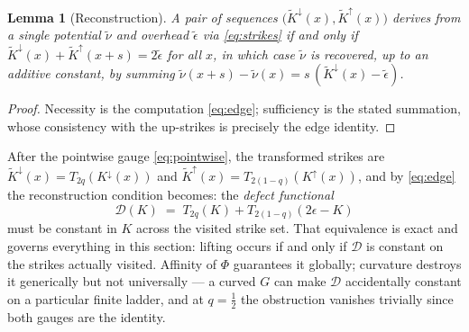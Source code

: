 \documentclass[11pt]{article}
\newtheorem{lemma}{Lemma}
\begin{document}
\begin{lemma}[Reconstruction]\label{lem:edge}
A pair of sequences $\big(\tilde K^{\downarrow}(x), \tilde K^{\uparrow}(x)\big)$ derives from a single potential $\tilde\nu$ and overhead $\tilde\epsilon$ via \eqref{eq:strikes} if and only if $\tilde K^{\downarrow}(x) + \tilde K^{\uparrow}(x+s) = 2\tilde\epsilon$ for all $x$, in which case $\tilde\nu$ is recovered, up to an additive constant, by summing $\tilde\nu(x+s) - \tilde\nu(x) = s\,(\tilde K^{\downarrow}(x) - \tilde\epsilon)$.
\end{lemma}

\begin{proof}
Necessity is the computation \eqref{eq:edge}; sufficiency is the stated summation, whose consistency with the up-strikes is precisely the edge identity.
\end{proof}

After the pointwise gauge \eqref{eq:pointwise}, the transformed strikes are $\tilde K^{\downarrow}(x) = T_{2q}(K^{\downarrow}(x))$ and $\tilde K^{\uparrow}(x) = T_{2(1-q)}(K^{\uparrow}(x))$, and by \eqref{eq:edge} the reconstruction condition becomes: the \emph{defect functional}
\begin{equation}
\mathcal D(K) \;=\; T_{2q}(K) + T_{2(1-q)}(2\epsilon - K)
\label{eq:defect}
\end{equation}
must be constant in $K$ across the visited strike set. That equivalence is exact and governs everything in this section: lifting occurs if and only if $\mathcal D$ is constant on the strikes actually visited. Affinity of $\Phi$ guarantees it globally; curvature destroys it generically but not universally --- a curved $G$ can make $\mathcal D$ accidentally constant on a particular finite ladder, and at $q = \tfrac12$ the obstruction vanishes trivially since both gauges are the identity.
\end{document}
